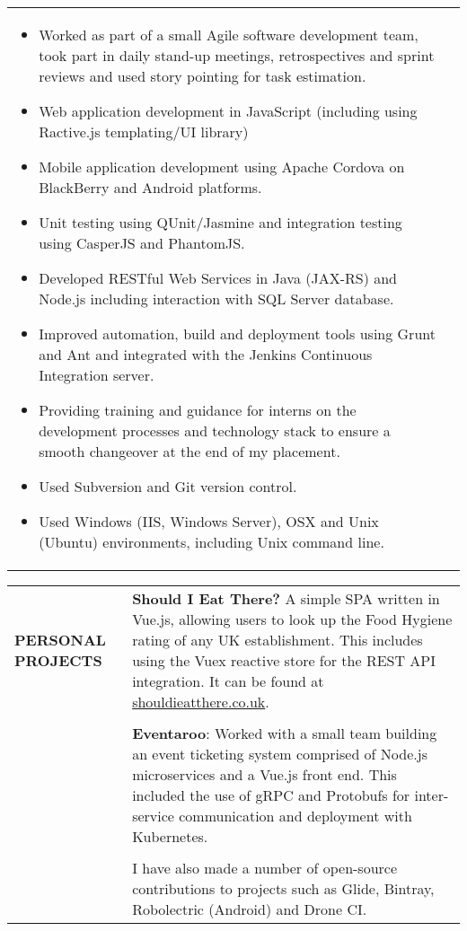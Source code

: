 \documentclass[7pt]{article}
\begin{document}
\begin{longtable}{@{} p{} p{}}
\begin{minipage} [t] {0.85\textwidth}
    \begin{itemize}
      \setlength\itemsep{-1pt}
      \item Worked as part of a small Agile software development team, took part in daily stand-up meetings, retrospectives and sprint reviews and used story pointing for task estimation.
      \item Web application development in JavaScript (including using Ractive.js templating/UI library)
      \item Mobile application development using Apache Cordova on BlackBerry and Android platforms.
      \item Unit testing using QUnit/Jasmine and integration testing using CasperJS and PhantomJS.
      \item Developed RESTful Web Services in Java (JAX-RS) and Node.js including interaction with SQL Server database.
      \item Improved automation, build and deployment tools using Grunt and Ant and integrated with the Jenkins Continuous Integration server.
      \item Providing training and guidance for interns on the development processes and technology stack to ensure a smooth changeover at the end of my placement.
      \item Used Subversion and Git version control.
      \item Used Windows (IIS, Windows Server), OSX and Unix (Ubuntu) environments, including Unix command line.
    \end{itemize}
  \end{minipage}
\end{longtable}

\vspace{0.25in}

\begin{tabular}{@{} p{} p{}}
  \textbf{PERSONAL PROJECTS} & \textbf{Should I Eat There?} A simple SPA written in Vue.js, allowing users to look up the Food Hygiene rating of any UK establishment. This includes using the Vuex reactive store for the REST API integration. It can be found at \href{http://shouldieatthere.co.uk}{shouldieatthere.co.uk}. \\
  & \\
  & \textbf{Eventaroo}: Worked with a small team building an event ticketing system comprised of Node.js microservices and a Vue.js front end. This included the use of gRPC and Protobufs for inter-service communication and deployment with Kubernetes. \\
  & \\
  & I have also made a number of open-source contributions to projects such as Glide, Bintray, Robolectric (Android) and Drone CI.
\end{tabular}
\end{document}
